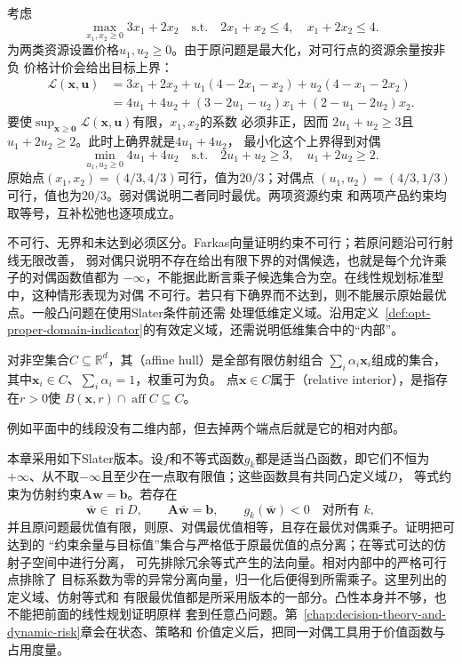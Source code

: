 \begin{example}[二维资源分配的原始与对偶证书]
\label{ex:opt-resource-lp-duality}
考虑
\[
  \max_{x_1,x_2\geq0}3x_1+2x_2
  \quad\text{s.t.}\quad
  2x_1+x_2\leq4,\quad x_1+2x_2\leq4.
\]
为两类资源设置价格$u_1,u_2\geq0$。由于原问题是最大化，对可行点的资源余量按非负
价格计价会给出目标上界：
\begin{align*}
  \mathcal{L}(\bm{x},\bm{u})
  &=
  3x_1+2x_2
  +u_1(4-2x_1-x_2)+u_2(4-x_1-2x_2)\\
  &=
  4u_1+4u_2
  +(3-2u_1-u_2)x_1+(2-u_1-2u_2)x_2.
\end{align*}
要使$\sup_{\bm{x}\geq\bm{0}}\mathcal{L}(\bm{x},\bm{u})$有限，$x_1,x_2$的系数
必须非正，因而
$2u_1+u_2\geq3$且$u_1+2u_2\geq2$。此时上确界就是$4u_1+4u_2$，
最小化这个上界得到对偶
\[
  \min_{u_1,u_2\geq0}4u_1+4u_2
  \quad\text{s.t.}\quad
  2u_1+u_2\geq3,\quad u_1+2u_2\geq2.
\]
原始点$(x_1,x_2)=(4/3,4/3)$可行，值为$20/3$；对偶点
$(u_1,u_2)=(4/3,1/3)$可行，值也为$20/3$。弱对偶说明二者同时最优。两项资源约束
和两项产品约束均取等号，互补松弛也逐项成立。
\end{example}

不可行、无界和未达到必须区分。Farkas向量证明约束不可行；若原问题沿可行射线无限改善，
弱对偶只说明不存在给出有限下界的对偶候选，也就是每个允许乘子的对偶函数值都为
$-\infty$，不能据此断言乘子候选集合为空。在线性规划标准型中，这种情形表现为对偶
不可行。若只有下确界而不达到，则不能展示原始最优点。一般凸问题在使用Slater条件前还需
处理低维定义域。沿用定义~\ref{def:opt-proper-domain-indicator}的有效定义域，还需说明低维集合中的“内部”。
\begin{definition}[仿射包与相对内部]
\label{def:opt-affine-hull-relative-interior}
对非空集合$C\subseteq\mathbb R^d$，其（affine hull）是全部有限仿射组合
$\sum_i\alpha_i\bm x_i$组成的集合，其中$\bm x_i\in C$、$\sum_i\alpha_i=1$，权重可为负。
点$\bm x\in C$属于（relative interior），是指存在$r>0$使
$B(\bm x,r)\cap\operatorname{aff}C\subseteq C$。
\end{definition}例如平面中的线段没有二维内部，但去掉两个端点后就是它的相对内部。

本章采用如下Slater版本。设$f$和不等式函数$g_k$都是适当凸函数，即它们不恒为
$+\infty$、从不取$-\infty$且至少在一点取有限值；这些函数具有共同凸定义域$D$，
等式约束为仿射约束$\bm{A}\bm{w}=\bm{b}$。若存在
\[
  \bar{\bm{w}}\in\operatorname{ri}D,\qquad
  \bm{A}\bar{\bm{w}}=\bm{b},\qquad
  g_k(\bar{\bm{w}})<0\quad\text{对所有 }k,
\]
并且原问题最优值有限，则原、对偶最优值相等，且存在最优对偶乘子。证明把可达到的
“约束余量与目标值”集合与严格低于原最优值的点分离；在等式可达的仿射子空间中进行分离，
可先排除冗余等式产生的法向量。相对内部中的严格可行点排除了
目标系数为零的异常分离向量，归一化后便得到所需乘子。这里列出的定义域、仿射等式和
有限最优值都是所采用版本的一部分。凸性本身并不够，也不能把前面的线性规划证明原样
套到任意凸问题。第~\ref{chap:decision-theory-and-dynamic-risk}章会在状态、策略和
价值定义后，把同一对偶工具用于价值函数与占用度量。

